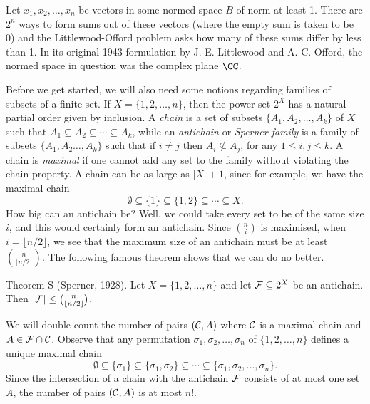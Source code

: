 


\def\norm#1{|\!|#1|\!|}
\def\C{{\cal C}}
\def\F{{\cal F}}
\def\eps{\epsilon}

\classicmode


\medskip
Let $x_1,x_2,\ldots,x_n$ be vectors in some normed space $B$ of norm at least 1.
There are $2^n$ ways to form sums out of these
vectors (where the empty sum is taken to be 0) and the Littlewood-Offord problem asks how many of these sums
differ by less than 1. In its original 1943 formulation by J. E. Littlewood and A. C. Offord,
the normed space in question was the complex plane $\CC$.

Before we get started, we will also need some notions regarding families of subsets of a finite set.
If $X = \{1,2,\ldots,n\}$,
then the power set $2^X$ has a natural partial order given by inclusion. A {\it chain} is a set of subsets
$\{A_1,A_2, \ldots, A_k\}$ of $X$ such that $A_1\subseteq A_2\subseteq\cdots\subseteq A_k$, while an
{\it antichain} or {\it Sperner family} is a family of subsets $\{A_1,A_2\ldots,A_k\}$ such that if $i\neq j$
then $A_i\not\subseteq A_j$, for any $1\leq i,j \leq k$. A chain is {\it maximal} if one cannot add any set
to the family without violating the chain property. A chain can be as large as $|X|+1$, since for example,
we have the maximal chain
$$\emptyset\subseteq \{1\}\subseteq \{1,2\} \subseteq \cdots \subseteq X.$$
How big can an antichain be? Well, we could take every set to be of the same size $i$, and this would certainly
form an antichain. Since ${n\choose i}$ is maximised, when $i =\lfloor n/2\rfloor$, we see that the maximum
size of an antichain must be at least ${n\choose \lfloor n/2\rfloor}$. The following famous theorem shows that
we can do no better.

\parenproclaim Theorem S (Sperner, {\rm 1928}). Let $X = \{1,2,\ldots, n\}$ and let $\F\subseteq 2^X$ be an
antichain. Then $|\F|\leq {n\choose \lfloor n/2\rfloor}$.

\proof We will double count the number of pairs $(\C, A)$ where $\C$ is a maximal chain and
$A\in \F\cap\C$. Observe that any permutation $\sigma_1, \sigma_2, \ldots, \sigma_n$
of $\{1,2,\ldots,n\}$ defines a unique maximal chain
$$\emptyset \subseteq \{\sigma_1\} \subseteq \{\sigma_1,\sigma_2\}\subseteq \cdots\subseteq\{\sigma_1,\sigma_2,
\ldots,\sigma_n\}.$$
Since the intersection of a chain with the antichain $\F$ consists of at most one set $A$, the number of
pairs $(\C,A)$ is at most $n!$.

